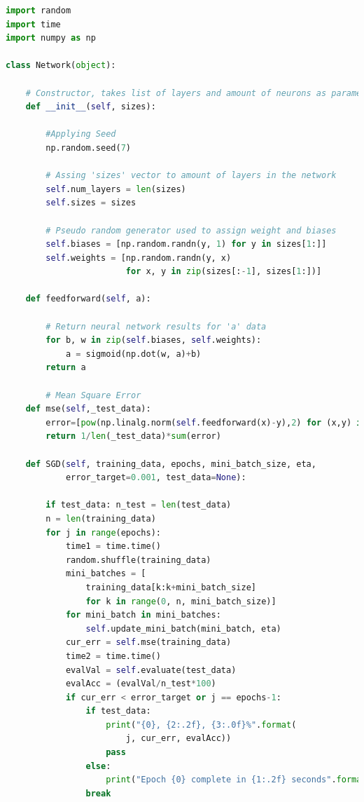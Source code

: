\documentclass[12pt,twoside]{article}
\begin{document}
\begin{lstlisting}[caption={Plik zawierający sieć - network.py},label={Lst:network_py},language=Python,basicstyle=\scriptsize]
import random
import time
import numpy as np

class Network(object):

    # Constructor, takes list of layers and amount of neurons as parameter
    def __init__(self, sizes):

        #Applying Seed
        np.random.seed(7)

        # Assing 'sizes' vector to amount of layers in the network
        self.num_layers = len(sizes)
        self.sizes = sizes

        # Pseudo random generator used to assign weight and biases 
        self.biases = [np.random.randn(y, 1) for y in sizes[1:]]
        self.weights = [np.random.randn(y, x)
                        for x, y in zip(sizes[:-1], sizes[1:])]

    def feedforward(self, a):

        # Return neural network results for 'a' data
        for b, w in zip(self.biases, self.weights):
            a = sigmoid(np.dot(w, a)+b)
        return a

        # Mean Square Error
    def mse(self,_test_data):
        error=[pow(np.linalg.norm(self.feedforward(x)-y),2) for (x,y) in _test_data]
        return 1/len(_test_data)*sum(error)

    def SGD(self, training_data, epochs, mini_batch_size, eta,
            error_target=0.001, test_data=None):

        if test_data: n_test = len(test_data)
        n = len(training_data)
        for j in range(epochs):
            time1 = time.time()
            random.shuffle(training_data)
            mini_batches = [
                training_data[k:k+mini_batch_size]
                for k in range(0, n, mini_batch_size)]
            for mini_batch in mini_batches:
                self.update_mini_batch(mini_batch, eta)
            cur_err = self.mse(training_data)
            time2 = time.time()
            evalVal = self.evaluate(test_data)
            evalAcc = (evalVal/n_test*100)
            if cur_err < error_target or j == epochs-1:
                if test_data:
                    print("{0}, {2:.2f}, {3:.0f}%".format(
                        j, cur_err, evalAcc))
                    pass
                else:
                    print("Epoch {0} complete in {1:.2f} seconds".format(j, time2-time1))
                break


\end{lstlisting}
\end{document}

